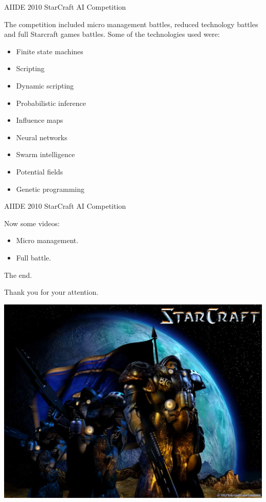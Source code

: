 \documentclass[10pt]{beamer}
\begin{document}
\begin{frame}{AIIDE 2010 StarCraft AI Competition}

  The competition included micro management battles, reduced technology battles and full Starcraft games battles. Some of the technologies used were:

      \begin{itemize}
       \item Finite state machines
       \item Scripting
       \item Dynamic scripting
       \item Probabilistic inference
       \item Influence maps
       \item Neural networks
       \item Swarm intelligence
       \item Potential fields
       \item Genetic programming
      \end{itemize}
\end{frame}

\begin{frame}{AIIDE 2010 StarCraft AI Competition}

Now some videos:

\begin{itemize}
 \item Micro management.
 \item Full battle.
\end{itemize}

\end{frame}



\begin{frame}{The end.}

Thank you for your attention. \newline

	  \begin{center}
	  \includegraphics[scale=0.2]{win.jpg}
	  \end{center}


\end{frame}
\end{document}
